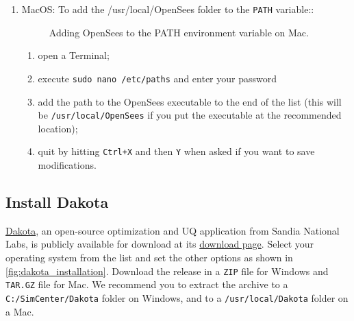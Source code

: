 \begin{enumerate}
\item MacOS: To add the /usr/local/OpenSees folder to the \texttt{PATH} variable::

\begin{figure}[!htbp]
  \caption{Adding OpenSees to the PATH environment variable on Mac.}
  \label{fig:add_env_path_Mac}
\end{figure}

\begin{enumerate}
    \item open a Terminal;
    \item execute \texttt{sudo nano /etc/paths} and enter your password
    \item add the path to the OpenSees executable to the end of the list (this will be \texttt{/usr/local/OpenSees} if you put the executable at the recommended location);
    \item quit by hitting \texttt{Ctrl+X} and then \texttt{Y} when asked if you want to save modifications.
\end{enumerate}

\end{enumerate}



\subsection{Install Dakota}

\href{http://dakota.sandia.gov}{Dakota}, an open-source  optimization and UQ application from Sandia National Labs, is publicly available for download at its \href{http://dakota.sandia.gov/download.html}{download page}. Select your operating system from the list and set the other options as shown in  \autoref{fig:dakota_installation}. Download the release in a \texttt{ZIP} file for Windows and \texttt{TAR.GZ} file for Mac. We recommend you to extract the archive to a \texttt{C:/SimCenter/Dakota} folder on Windows, and to a \texttt{/usr/local/Dakota} folder on a Mac.

